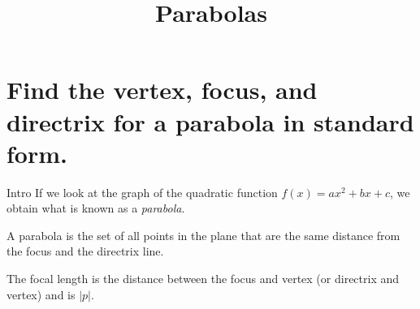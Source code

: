 \documentclass[t,usenames,dvipsnames]{beamer}
\title{Parabolas}
\author{}
\date{}
\begin{document}
\begin{frame}
    \maketitle
\end{frame}

\section{Find the vertex, focus, and directrix for a parabola in standard form.}

\begin{frame}{Intro}
If we look at the graph of the quadratic function $f(x) = ax^2 + bx + c$, we obtain what is known as a \emph{parabola}.    \newline\\    \pause

A \alert{parabola} is the set of all points in the plane that are the same distance from the focus and the directrix line.
\end{frame}

\begin{frame}{}
\begin{center}
\end{center}
\pause

The \alert{focal length} is the distance between the focus and vertex (or directrix and vertex) and is $|p|$.
\end{frame}
\end{document}
